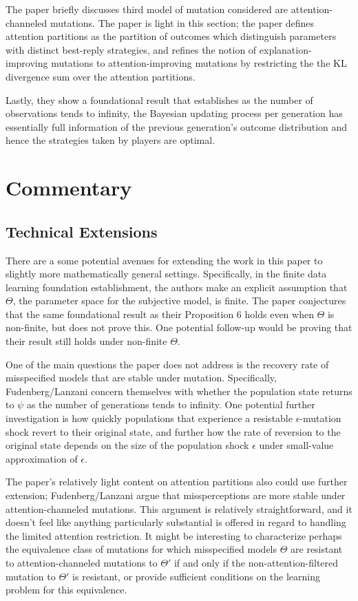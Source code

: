 \documentclass[10pt,letter]{article}
\begin{document}
The paper briefly discusses third model of mutation considered are attention-channeled mutations. The paper is light in this section; the paper defines attention partitions as the partition of outcomes which distinguish parameters with distinct best-reply strategies, and refines the notion of explanation-improving mutations to attention-improving mutations by restricting the the KL divergence sum over the attention partitions.

Lastly, they show a foundational result that establishes as the number of observations tends to infinity, the Bayesian updating process per generation has essentially full information of the previous generation's outcome distribution and hence the strategies taken by players are optimal.

\section*{Commentary}
\subsection*{Technical Extensions}
There are a some potential avenues for extending the work in this paper to slightly more mathematically general settings. Specifically, in the finite data learning foundation establishment, the authors make an explicit assumption that $\Theta$, the parameter space for the subjective model, is finite. The paper conjectures that the same foundational result as their Proposition 6 holds even when $\Theta$ is non-finite, but does not prove this. One potential follow-up would be proving that their result still holds under non-finite $\Theta$.

One of the main questions the paper does not address is the recovery rate of misspecified models that are stable under mutation. Specifically, Fudenberg/Lanzani concern themselves with whether the population state returns to $\psi$ as the number of generations tends to infinity. One potential further investigation is how quickly populations that experience a resistable $\epsilon$-mutation shock revert to their original state, and further how the rate of reversion to the original state depends on the size of the population shock $\epsilon$ under small-value approximation of $\epsilon$.

The paper's relatively light content on attention partitions also could use further extension; Fudenberg/Lanzani argue that missperceptions are more stable under attention-channeled mutations. This argument is relatively straightforward, and it doesn't feel like anything particularly substantial is offered in regard to handling the limited attention restriction. It might be interesting to characterize perhaps the equivalence class of mutations for which misspecified models $\Theta$ are resistant to attention-channeled mutations to $\Theta'$ if and only if the non-attention-filtered mutation to $\Theta'$ is resistant, or provide sufficient conditions on the learning problem for this equivalence.
\end{document}
